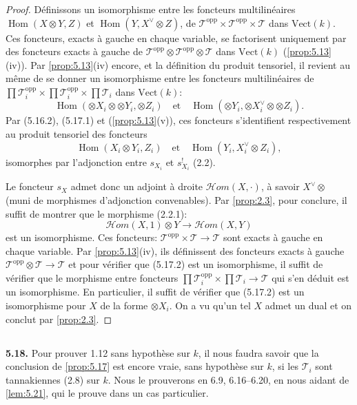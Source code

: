 \documentclass[12pt,a4paper]{article}
\theoremstyle{plain}
\theoremstyle{definition}
\theoremstyle{remark}
\DeclareMathOperator{\Hom}{Hom}
\begin{document}
\begin{proof}
Définissons un isomorphisme entre les foncteurs multilinéaires $\Hom(X \otimes Y, Z)$ et $\Hom(Y, X^\vee \otimes Z)$, de $\mathcal{T}^\mathrm{opp} \times \mathcal{T}^\mathrm{opp} \times \mathcal{T}$ dans $\mathrm{Vect}(k)$. Ces foncteurs, exacts à gauche en chaque variable, se factorisent uniquement par des foncteurs exacts à gauche de $\mathcal{T}^\mathrm{opp} \otimes \mathcal{T}^\mathrm{opp} \otimes \mathcal{T}$ dans $\mathrm{Vect}(k)$ (\ref{prop:5.13}(iv)). Par \ref{prop:5.13}(iv) encore, et la définition du produit tensoriel, il revient au même de se donner un isomorphisme entre les foncteurs multilinéaires de $\prod \mathcal{T}_i^\mathrm{opp} \times \prod \mathcal{T}_i^\mathrm{opp} \times \prod \mathcal{T}_i$ dans $\mathrm{Vect}(k)$:
\[
\Hom(\otimes X_i \otimes \otimes Y_i, \otimes Z_i) \quad \text{et} \quad \Hom(\otimes Y_i, \otimes X_i^\vee \otimes \otimes Z_i).
\]
Par (5.16.2), (5.17.1) et (\ref{prop:5.13}(v)), ces foncteurs s'identifient respectivement au produit tensoriel des foncteurs
\[
\Hom(X_i \otimes Y_i, Z_i) \quad \text{et} \quad \Hom(Y_i, X_i^\vee \otimes Z_i),
\]
isomorphes par l'adjonction entre $s_{X_i}$ et $s_{X_i}^!$ (2.2).

Le foncteur $s_X$ admet donc un adjoint à droite $\mathcal{H}om(X,\cdot)$, à savoir $X^\vee \otimes$ (muni de morphismes d'adjonction convenables). Par \ref{prop:2.3}, pour conclure, il suffit de montrer que le morphisme (2.2.1):
\begin{equation}\label{eq:5.17.2}
\mathcal{H}om(X,1) \otimes Y \to \mathcal{H}om(X,Y)
\end{equation}
est un isomorphisme. Ces foncteurs: $\mathcal{T}^\mathrm{opp} \times \mathcal{T} \to \mathcal{T}$ sont exacts à gauche en chaque variable. Par \ref{prop:5.13}(iv), ils définissent des foncteurs exacts à gauche $\mathcal{T}^\mathrm{opp} \otimes \mathcal{T} \to \mathcal{T}$ et pour vérifier que (5.17.2) est un isomorphisme, il suffit de vérifier que le morphisme entre foncteurs $\prod \mathcal{T}_i^\mathrm{opp} \times \prod \mathcal{T}_i \to \mathcal{T}$ qui s'en déduit est un isomorphisme. En particulier, il suffit de vérifier que (5.17.2) est un isomorphisme pour $X$ de la forme $\otimes X_i$. On a vu qu'un tel $X$ admet un dual et on conclut par \ref{prop:2.3}.
\end{proof}

\subsection{}

\textbf{5.18.} Pour prouver 1.12 sans hypothèse sur $k$, il nous faudra savoir que la conclusion de \ref{prop:5.17} est encore vraie, sans hypothèse sur $k$, si les $\mathcal{T}_i$ sont tannakiennes (2.8) sur $k$. Nous le prouverons en 6.9, 6.16--6.20, en nous aidant de \ref{lem:5.21}, qui le prouve dans un cas particulier.
\end{document}
